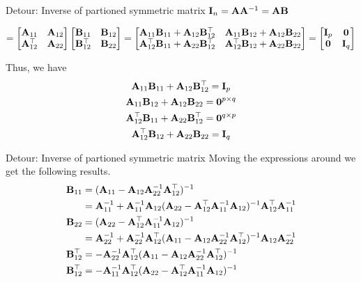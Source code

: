 \documentclass{beamer}
\begin{document}
\begin{frame}{Detour: Inverse of partioned symmetric matrix}
	$\mathbf{I}_n = \mathbf{A}\mathbf{A}^{-1} = \mathbf{A}\mathbf{B}$
	
	$=\begin{bmatrix}
	\mathbf{A}_{11} & \mathbf{A}_{12}\\
	\mathbf{A}_{12}^\top & \mathbf{A}_{22} \\
	\end{bmatrix} \begin{bmatrix}
	\mathbf{B}_{11} & \mathbf{B}_{12}\\
	\mathbf{B}_{12}^\top & \mathbf{B}_{22} \\
	\end{bmatrix}
	= \begin{bmatrix}
	\mathbf{A}_{11}\mathbf{B}_{11} +\mathbf{A}_{12}\mathbf{B}_{12}^\top & \mathbf{A}_{11}\mathbf{B}_{12} + \mathbf{A}_{12}\mathbf{B}_{22}\\
	\mathbf{A}_{12}^\top\mathbf{B}_{11} + \mathbf{A}_{22}\mathbf{B}_{12}^\top & \mathbf{A}_{12}^\top\mathbf{B}_{12} + \mathbf{A}_{22}\mathbf{B}_{22}  \\
	\end{bmatrix} = \begin{bmatrix}
	\mathbf{I}_p & \mathbf{0} \\
	\mathbf{0} & \mathbf{I}_q
	\end{bmatrix}$
	
	Thus, we have
	\begin{gather}
	\mathbf{A}_{11}\mathbf{B}_{11} +\mathbf{A}_{12}\mathbf{B}_{12}^\top = \mathbf{I}_p\\
	\mathbf{A}_{11}\mathbf{B}_{12} + \mathbf{A}_{12}\mathbf{B}_{22} = \mathbf{0}^{p\times q}\\
	\mathbf{A}_{12}^\top\mathbf{B}_{11} + \mathbf{A}_{22}\mathbf{B}_{12}^\top = \mathbf{0}^{q\times p}\\
	\mathbf{A}_{12}^\top\mathbf{B}_{12} + \mathbf{A}_{22}\mathbf{B}_{22} = \mathbf{I}_q
	\end{gather}
\end{frame}

\begin{frame}{Detour: Inverse of partioned symmetric matrix}
	Moving the expressions around we get the following results.
	\begin{align*}
	\mathbf{B}_{11} &= (\mathbf{A}_{11} - \mathbf{A}_{12}\mathbf{A}_{22}^{-1} \mathbf{A}_{12}^\top)^{-1} \\
	&= \mathbf{A}_{11}^{-1} + \mathbf{A}_{11}^{-1} \mathbf{A}_{12}(\mathbf{A}_{22} - \mathbf{A}_{12}^\top\mathbf{A}_{11}^{-1} \mathbf{A}_{12})^{-1} \mathbf{A}_{12}^\top\mathbf{A}_{11}^{-1}\\
	\mathbf{B}_{22} &= (\mathbf{A}_{22} - \mathbf{A}_{12}^\top\mathbf{A}_{11}^{-1} \mathbf{A}_{12})^{-1} \\
	&= \mathbf{A}_{22}^{-1} + \mathbf{A}_{22}^{-1} \mathbf{A}_{12}^\top(\mathbf{A}_{11} - \mathbf{A}_{12}\mathbf{A}_{22}^{-1} \mathbf{A}_{12}^\top)^{-1} \mathbf{A}_{12}\mathbf{A}_{22}^{-1}\\
	\mathbf{B}_{12}^\top &= - \mathbf{A}_{22}^{-1} \mathbf{A}_{12}^\top ( \mathbf{A}_{11} - \mathbf{A}_{12} \mathbf{A}_{22}^{-1} \mathbf{A}_{12}^\top)^{-1}\\
	\mathbf{B}_{12}^\top &= - \mathbf{A}_{11}^{-1} \mathbf{A}_{12}^\top ( \mathbf{A}_{22} - \mathbf{A}_{12}^\top \mathbf{A}_{11}^{-1} \mathbf{A}_{12})^{-1}
	\end{align*}
\end{frame}
\end{document}

